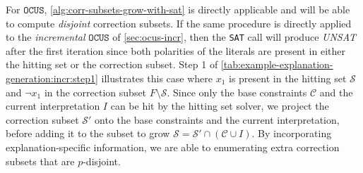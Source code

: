 \documentclass[a4paper,UKenglish,cleveref, autoref, thm-restate, pdfa]{lipics-v2021}
\newcommand\m[1]{\mathcal{#1}}
\renewcommand\comment[1]{}
\newcommand{\emilio}[1]{{\comment{\color{red}Emilio: #1}}}
\newcommand{\bart}[1]{{\comment{\color{OliveGreen}Bart: #1}}}
\newcommand\formulac{\ensuremath{\m{C} }\xspace}
\newcommand\mm[1]{\ensuremath{#1}\xspace}
\newcommand\call[1]{\mm{\texttt{#1}}}
\newcommand\sat{\texttt{{SAT}}\xspace}
\newcommand\comus{\mm{\call{OCUS}}}
\begin{document}
	For \comus, \cref{alg:corr-subsets-grow-with-sat} is directly applicable and will be able to compute \emph{disjoint} correction subsets. 
	If the same procedure is directly applied to the \emph{incremental} \comus of \cref{sec:ocus-incr}, then the \sat call will produce \emph{UNSAT} after the first iteration since both polarities of the literals are present in either the hitting set or the correction subset.
	\bart{These are not properties of OCUS and INCR-OCUS. 
		This is an issue with \emph{our use} of OCUS. The way we USE the incremental OCUS for generating explanations (by adding the two polarities) means that this will not do anything. But, you could perfectly do incremental ocus in a setting where it DOES produce multiple correction subsets}
	\emilio{Is this a better way to put it ?}
	Step 1 of \cref{tab:example-explanation-generation:incr:step1} illustrates this case where $x_1$ is present in the hitting set $\m{S}$ and $\lnot x_1$ in the correction subset $F \setminus \m{S}$. 
	Since only the base constraints $\formulac$ and the current interpretation $I$ can be hit by the hitting set solver, we project the correction subset $\m{S'}$ onto the base constraints and the current interpretation, before adding it to the subset to grow $\m{S} = \m{S}' \cap (\formulac\cup I)$. 
	By incorporating explanation-specific information, we are able to enumerating extra correction subsets that are $p$-disjoint.
	
\end{document}

